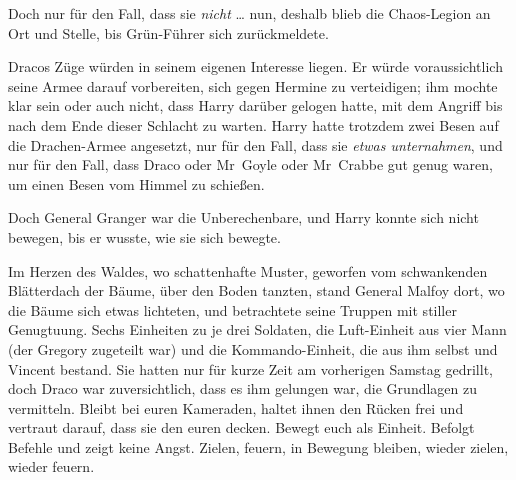 Doch nur für den Fall, dass sie \emph{nicht} … nun, deshalb blieb die Chaos-Legion an Ort und Stelle, bis Grün-Führer sich zurückmeldete.

Dracos Züge würden in seinem eigenen Interesse liegen. Er würde voraussichtlich seine Armee darauf vorbereiten, sich gegen Hermine zu verteidigen; ihm mochte klar sein oder auch nicht, dass Harry darüber gelogen hatte, mit dem Angriff bis nach dem Ende dieser Schlacht zu warten. Harry hatte trotzdem zwei Besen auf die Drachen-Armee angesetzt, nur für den Fall, dass sie \emph{etwas unternahmen}, und nur für den Fall, dass Draco oder Mr~Goyle oder Mr~Crabbe gut genug waren, um einen Besen vom Himmel zu schießen.

Doch General Granger war die Unberechenbare, und Harry konnte sich nicht bewegen, bis er wusste, wie sie sich bewegte.

\later

Im Herzen des Waldes, wo schattenhafte Muster, geworfen vom schwankenden Blätterdach der Bäume, über den Boden tanzten, stand General Malfoy dort, wo die Bäume sich etwas lichteten, und betrachtete seine Truppen mit stiller Genugtuung. Sechs Einheiten zu je drei Soldaten, die Luft-Einheit aus vier Mann (der Gregory zugeteilt war) und die Kommando-Einheit, die aus ihm selbst und Vincent bestand. Sie hatten nur für kurze Zeit am vorherigen Samstag gedrillt, doch Draco war zuversichtlich, dass es ihm gelungen war, die Grundlagen zu vermitteln. Bleibt bei euren Kameraden, haltet ihnen den Rücken frei und vertraut darauf, dass sie den euren decken. Bewegt euch als Einheit. Befolgt Befehle und zeigt keine Angst. Zielen, feuern, in Bewegung bleiben, wieder zielen, wieder feuern.


